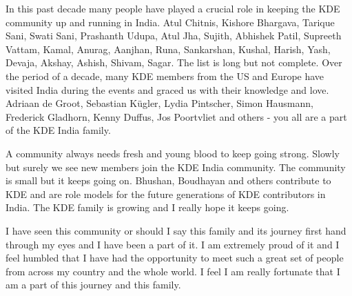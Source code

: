 In this past decade many people have played a crucial role in keeping the KDE community up and running in India. Atul Chitnis, Kishore Bhargava, Tarique Sani, Swati Sani, Prashanth Udupa, Atul Jha, Sujith, Abhishek Patil, Supreeth Vattam, Kamal, Anurag, Aanjhan, Runa, Sankarshan, Kushal, Harish, Yash, Devaja, Akshay, Ashish, Shivam, Sagar. The list is long but not complete. Over the period of a decade, many KDE members from the US and Europe have visited India during the events and graced us with their knowledge and love. Adriaan de Groot, Sebastian K\"{u}gler, Lydia Pintscher, Simon Hausmann, Frederick Gladhorn, Kenny Duffus, Jos Poortvliet and others - you all are a part of the KDE India family.

A community always needs fresh and young blood to keep going strong. Slowly but surely we see new members join the KDE India community. The community is small but it keeps going on. Bhushan, Boudhayan and others contribute to KDE and are role models for the future generations of KDE contributors in India. The KDE family is growing and I really hope it keeps going.

I have seen this community or should I say this family and its journey first hand through my eyes and I have been a part of it. I am extremely proud of it and I feel humbled that I have had the opportunity to meet such a great set of people from across my country and the whole world. I feel I am really fortunate that I am a part of this journey and this family.
